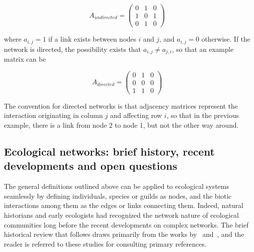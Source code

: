 \[
A_{undirected} = \begin{pmatrix}
0& 1& 0 \\
1& 0& 1 \\
0& 1& 0
\end{pmatrix}
\]

where $a_{i,j} = 1$ if a link exists between nodes $i$ and $j$, and $a_{i,j} = 0$ otherwise. If the network is directed, the possibility exists that $a_{i,j} \neq a_{j,i}$, so that an example matrix can be

\[
A_{directed} = \begin{pmatrix}
0& 1& 0 \\
0& 0& 0 \\
1& 1& 0
\end{pmatrix}
\]

The convention for directed networks is that adjacency matrices represent the interaction originating in column $j$ and affecting row $i$, so that in the previous example, there is a link from node 2 to node 1, but not the other way around. %

\subsection{Ecological networks: brief history, recent developments and open questions}

The general definitions outlined above can be applied to ecological systems seamlessly by defining individuals, species or guilds as nodes, and the biotic interactions among them as the edges or links connecting them. Indeed, natural historians and early ecologists had recognized the network nature of ecological communities long before the recent developments on complex networks. The brief historical review that follows draws primarily from the works by~\cite{Bersier2007} and~\cite{Ings2018}, and the reader is referred to these studies for consulting primary references.

